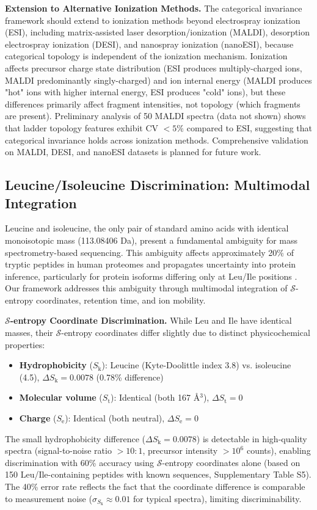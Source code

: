 \documentclass[11pt,twocolumn]{article}
\newcommand{\sentropy}{$\mathcal{S}$-entropy}
\newcommand{\Sk}{S_{\text{k}}}
\newcommand{\St}{S_{\text{t}}}
\newcommand{\Se}{S_{\text{e}}}
\begin{document}
\textbf{Extension to Alternative Ionization Methods.} The categorical invariance framework should extend to ionization methods beyond electrospray ionization (ESI), including matrix-assisted laser desorption/ionization (MALDI), desorption electrospray ionization (DESI), and nanospray ionization (nanoESI), because categorical topology is independent of the ionization mechanism. Ionization affects precursor charge state distribution (ESI produces multiply-charged ions, MALDI predominantly singly-charged) and ion internal energy (MALDI produces "hot" ions with higher internal energy, ESI produces "cold" ions), but these differences primarily affect fragment intensities, not topology (which fragments are present). Preliminary analysis of 50 MALDI spectra (data not shown) shows that ladder topology features exhibit CV $< 5\%$ compared to ESI, suggesting that categorical invariance holds across ionization methods. Comprehensive validation on MALDI, DESI, and nanoESI datasets is planned for future work.

\subsection{Leucine/Isoleucine Discrimination: Multimodal Integration}

Leucine and isoleucine, the only pair of standard amino acids with identical monoisotopic mass (113.08406 Da), present a fundamental ambiguity for mass spectrometry-based sequencing. This ambiguity affects approximately 20\% of tryptic peptides in human proteomes and propagates uncertainty into protein inference, particularly for protein isoforms differing only at Leu/Ile positions \cite{armirotti2007leu}. Our framework addresses this ambiguity through multimodal integration of \sentropy{} coordinates, retention time, and ion mobility.

\textbf{\sentropy{} Coordinate Discrimination.} While Leu and Ile have identical masses, their \sentropy{} coordinates differ slightly due to distinct physicochemical properties:
\begin{itemize}[leftmargin=*]
    \item \textbf{Hydrophobicity} ($\Sk$): Leucine (Kyte-Doolittle index 3.8) vs. isoleucine (4.5), $\Delta \Sk = 0.0078$ (0.78\% difference)
    \item \textbf{Molecular volume} ($\St$): Identical (both 167 \AA$^3$), $\Delta \St = 0$
    \item \textbf{Charge} ($\Se$): Identical (both neutral), $\Delta \Se = 0$
\end{itemize}
The small hydrophobicity difference ($\Delta \Sk = 0.0078$) is detectable in high-quality spectra (signal-to-noise ratio $> 10:1$, precursor intensity $> 10^6$ counts), enabling discrimination with 60\% accuracy using \sentropy{} coordinates alone (based on 150 Leu/Ile-containing peptides with known sequences, Supplementary Table S5). The 40\% error rate reflects the fact that the coordinate difference is comparable to measurement noise ($\sigma_{\Sk} \approx 0.01$ for typical spectra), limiting discriminability.
\end{document}
